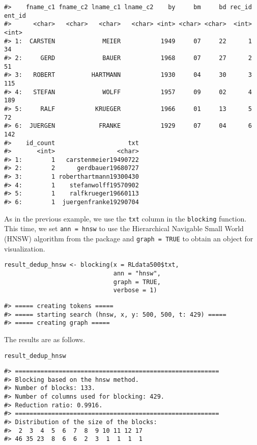 \begin{verbatim}
#>    fname_c1 fname_c2 lname_c1 lname_c2    by     bm     bd rec_id ent_id
#>      <char>   <char>   <char>   <char> <int> <char> <char>  <int>  <int>
#> 1:  CARSTEN             MEIER           1949     07     22      1     34
#> 2:     GERD             BAUER           1968     07     27      2     51
#> 3:   ROBERT          HARTMANN           1930     04     30      3    115
#> 4:   STEFAN             WOLFF           1957     09     02      4    189
#> 5:     RALF           KRUEGER           1966     01     13      5     72
#> 6:  JUERGEN            FRANKE           1929     07     04      6    142
#>    id_count                    txt
#>       <int>                 <char>
#> 1:        1   carstenmeier19490722
#> 2:        2      gerdbauer19680727
#> 3:        1 roberthartmann19300430
#> 4:        1    stefanwolff19570902
#> 5:        1    ralfkrueger19660113
#> 6:        1  juergenfranke19290704
\end{verbatim}

As in the previous example, we use the \texttt{txt} column in the \texttt{blocking}
function. This time, we set \texttt{ann\ =\ hnsw} to use the Hierarchical
Navigable Small World (HNSW) algorithm from the 
package and \texttt{graph\ =\ TRUE} to obtain an  object for
visualization.

\begin{verbatim}
result_dedup_hnsw <- blocking(x = RLdata500$txt,
                              ann = "hnsw",
                              graph = TRUE,
                              verbose = 1)
\end{verbatim}

\begin{verbatim}
#> ===== creating tokens =====
#> ===== starting search (hnsw, x, y: 500, 500, t: 429) =====
#> ===== creating graph =====
\end{verbatim}

The results are as follows.

\begin{verbatim}
result_dedup_hnsw
\end{verbatim}

\begin{verbatim}
#> ========================================================
#> Blocking based on the hnsw method.
#> Number of blocks: 133.
#> Number of columns used for blocking: 429.
#> Reduction ratio: 0.9916.
#> ========================================================
#> Distribution of the size of the blocks:
#>  2  3  4  5  6  7  8  9 10 11 12 17 
#> 46 35 23  8  6  6  2  3  1  1  1  1
\end{verbatim}

